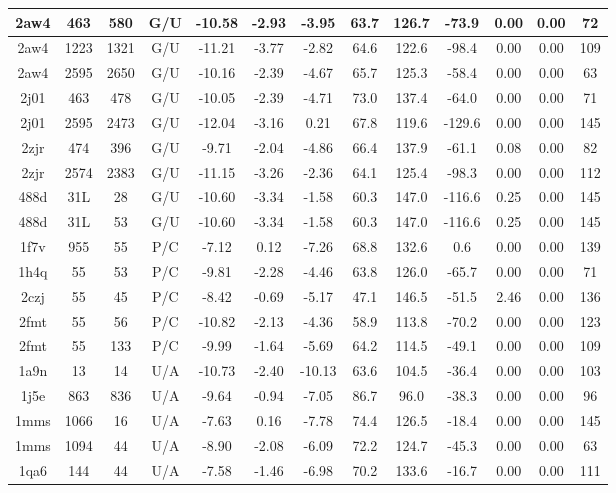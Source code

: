 {\begin{center}
\begin{longtable}{|c|c|c|c|c|c|c|c|c|c|c|c|c|}
2aw4 & 463 & 580 & G/U & -10.58 & -2.93 & -3.95 & 63.7 & 126.7 & -73.9 & 0.00 & 0.00 & 72 \\ \hline
2aw4 & 1223 & 1321 & G/U & -11.21 & -3.77 & -2.82 & 64.6 & 122.6 & -98.4 & 0.00 & 0.00 & 109 \\ \hline
2aw4 & 2595 & 2650 & G/U & -10.16 & -2.39 & -4.67 & 65.7 & 125.3 & -58.4 & 0.00 & 0.00 & 63 \\ \hline
2j01 & 463 & 478 & G/U & -10.05 & -2.39 & -4.71 & 73.0 & 137.4 & -64.0 & 0.00 & 0.00 & 71 \\ \hline
2j01 & 2595 & 2473 & G/U & -12.04 & -3.16 & 0.21 & 67.8 & 119.6 & -129.6 & 0.00 & 0.00 & 145 \\ \hline
2zjr & 474 & 396 & G/U & -9.71 & -2.04 & -4.86 & 66.4 & 137.9 & -61.1 & 0.08 & 0.00 & 82 \\ \hline
2zjr & 2574 & 2383 & G/U & -11.15 & -3.26 & -2.36 & 64.1 & 125.4 & -98.3 & 0.00 & 0.00 & 112 \\ \hline
488d & 31L & 28 & G/U & -10.60 & -3.34 & -1.58 & 60.3 & 147.0 & -116.6 & 0.25 & 0.00 & 145 \\ \hline
488d & 31L & 53 & G/U & -10.60 & -3.34 & -1.58 & 60.3 & 147.0 & -116.6 & 0.25 & 0.00 & 145 \\ \hline
1f7v & 955 & 55 & P/C & -7.12 & 0.12 & -7.26 & 68.8 & 132.6 & 0.6 & 0.00 & 0.00 & 139 \\ \hline
1h4q & 55 & 53 & P/C & -9.81 & -2.28 & -4.46 & 63.8 & 126.0 & -65.7 & 0.00 & 0.00 & 71 \\ \hline
2czj & 55 & 45 & P/C & -8.42 & -0.69 & -5.17 & 47.1 & 146.5 & -51.5 & 2.46 & 0.00 & 136 \\ \hline
2fmt & 55 & 56 & P/C & -10.82 & -2.13 & -4.36 & 58.9 & 113.8 & -70.2 & 0.00 & 0.00 & 123 \\ \hline
2fmt & 55 & 133 & P/C & -9.99 & -1.64 & -5.69 & 64.2 & 114.5 & -49.1 & 0.00 & 0.00 & 109 \\ \hline
1a9n & 13 & 14 & U/A & -10.73 & -2.40 & -10.13 & 63.6 & 104.5 & -36.4 & 0.00 & 0.00 & 103 \\ \hline
1j5e & 863 & 836 & U/A & -9.64 & -0.94 & -7.05 & 86.7 & 96.0 & -38.3 & 0.00 & 0.00 & 96 \\ \hline
1mms & 1066 & 16 & U/A & -7.63 & 0.16 & -7.78 & 74.4 & 126.5 & -18.4 & 0.00 & 0.00 & 145 \\ \hline
1mms & 1094 & 44 & U/A & -8.90 & -2.08 & -6.09 & 72.2 & 124.7 & -45.3 & 0.00 & 0.00 & 63 \\ \hline
1qa6 & 144 & 44 & U/A & -7.58 & -1.46 & -6.98 & 70.2 & 133.6 & -16.7 & 0.00 & 0.00 & 111 \\ \hline

\end{longtable}
\end{center}}
